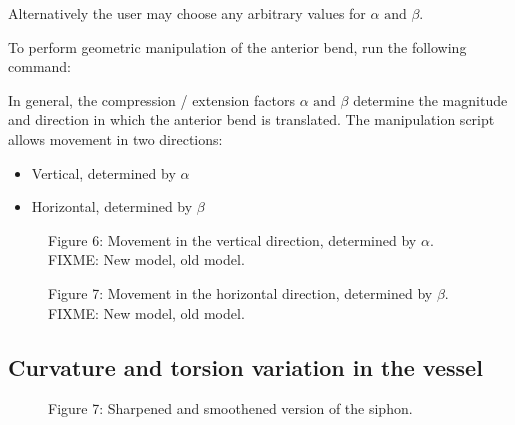 \documentclass[letterpaper,10pt,english]{sphinxmanual}
\begin{document}
Alternatively the user may choose any arbitrary values for \(\alpha \text{ and } \beta\).

To perform geometric manipulation of the anterior bend, run the following command:

%
\begin{sphinxVerbatim}[commandchars=\\\{\}]
   \PYG{p}{[}\PYG{p}{]}  \PYG{p}{[}\PYG{p}{]}  \PYG{p}{[}\PYG{p}{]}  \PYG{p}{[}\PYG{p}{]}
\end{sphinxVerbatim}

In general, the compression / extension factors \(\alpha \text{ and } \beta\) determine the magnitude and direction in which the anterior bend is translated. The manipulation script allows movement in two directions:
\begin{itemize}
\item {} 
Vertical, determined by \(\alpha\)

\item {} 
Horizontal, determined by \(\beta\)

\end{itemize}

\begin{figure}[htbp]
\centering
\capstart

\noindent{}
\caption{Figure 6: Movement in the vertical direction, determined by \(\alpha\). FIXME: New model, old model.}\label{\detokenize{getting_started:id13}}\end{figure}

\begin{figure}[htbp]
\centering
\capstart

\noindent{}
\caption{Figure 7: Movement in the horizontal direction, determined by \(\beta\). FIXME: New model, old model.}\label{\detokenize{getting_started:id14}}\end{figure}


\subsection{Curvature and torsion variation in the vessel}
\label{\detokenize{getting_started:curvature-and-torsion-variation-in-the-vessel}}
\begin{figure}[htbp]
\centering
\capstart

\noindent{}
\caption{Figure 7: Sharpened and smoothened version of the siphon.}\label{\detokenize{getting_started:id15}}\end{figure}
\end{document}
